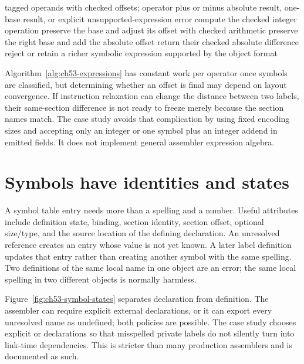\begin{algorithm}[htbp]
\caption{Classify addition and subtraction in a simple relocatable-expression domain.}
\label{alg:ch53-expressions}
\begin{pseudocode}
\Require tagged operands with checked offsets; operator plus or minus
\Ensure absolute result, one-base result, or explicit unsupported-expression error
  \State compute the checked integer operation
  \State preserve the base and adjust its offset with checked arithmetic
  \State preserve the right base and add the absolute offset
  \State return their checked absolute difference
\Else
  \State reject or retain a richer symbolic expression supported by the object format
\EndIf
\end{pseudocode}
\end{algorithm}

Algorithm~\ref{alg:ch53-expressions} has constant work per operator once symbols are classified, but determining whether an offset is final may depend on layout convergence.
If instruction relaxation can change the distance between two labels, their same-section difference is not ready to freeze merely because the section names match.
The case study avoids that complication by using fixed encoding sizes and accepting only an integer or one symbol plus an integer addend in emitted fields.
It does not implement general assembler expression algebra.

\section{Symbols have identities and states}
\label{sec:ch53-symbols}

A symbol table entry needs more than a spelling and a number.
Useful attributes include definition state, binding, section identity, section offset, optional size/type, and the source location of the defining declaration.
An unresolved reference creates an entry whose value is not yet known.
A later label definition updates that entry rather than creating another symbol with the same spelling.
Two definitions of the same local name in one object are an error; the same local spelling in two different objects is normally harmless.

Figure~\ref{fig:ch53-symbol-states} separates declaration from definition.
The assembler can require explicit external declarations, or it can export every unresolved name as undefined; both policies are possible.
The case study chooses explicit  or  declarations so that misspelled private labels do not silently turn into link-time dependencies.
This is stricter than many production assemblers and is documented as such.

